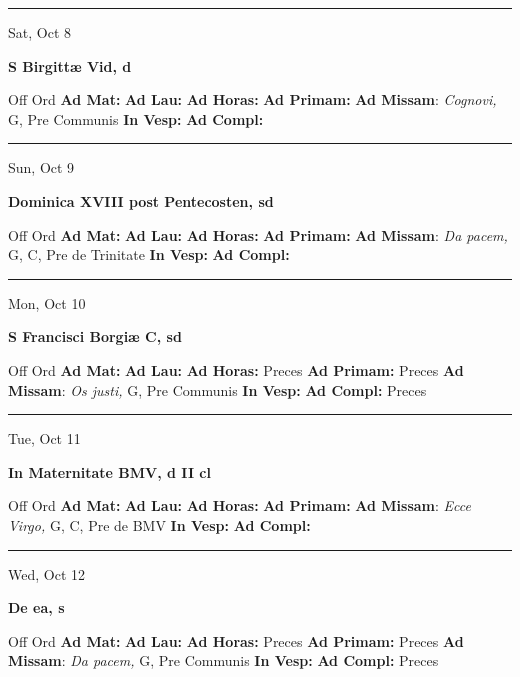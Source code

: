 \documentclass[letterpaper, 10pt]{article}
\begin{document}
\hrule
\begin{center}
Sat, Oct 8
\end{center}\textbf{ \large S Birgittæ Vid, \textnormal{\normalsize d}}
\begin{justify}
Off Ord
\textbf{Ad Mat: }
\textbf{Ad Lau: }
\textbf{Ad Horas: }
\textbf{Ad Primam: }
\textbf{Ad Missam}: \textit{Cognovi,} G, Pre Communis
\textbf{In Vesp: }
\textbf{Ad Compl: }\end{justify}



\hrule
\begin{center}
Sun, Oct 9
\end{center}\textbf{ \large Dominica XVIII post Pentecosten, \textnormal{\normalsize sd}}
\begin{justify}
Off Ord
\textbf{Ad Mat: }
\textbf{Ad Lau: }
\textbf{Ad Horas: }
\textbf{Ad Primam: }
\textbf{Ad Missam}: \textit{Da pacem,} G, C, Pre de Trinitate
\textbf{In Vesp: }
\textbf{Ad Compl: }\end{justify}



\hrule
\begin{center}
Mon, Oct 10
\end{center}\textbf{ \large S Francisci Borgiæ C, \textnormal{\normalsize sd}}
\begin{justify}
Off Ord
\textbf{Ad Mat: }
\textbf{Ad Lau: }
\textbf{Ad Horas: }Preces
\textbf{Ad Primam: }Preces
\textbf{Ad Missam}: \textit{Os justi,} G, Pre Communis
\textbf{In Vesp: }
\textbf{Ad Compl: }Preces\end{justify}



\hrule
\begin{center}
Tue, Oct 11
\end{center}\textbf{ \large In Maternitate BMV, \textnormal{\normalsize d II cl}}
\begin{justify}
Off Ord
\textbf{Ad Mat: }
\textbf{Ad Lau: }
\textbf{Ad Horas: }
\textbf{Ad Primam: }
\textbf{Ad Missam}: \textit{Ecce Virgo,} G, C, Pre de BMV
\textbf{In Vesp: }
\textbf{Ad Compl: }\end{justify}



\hrule
\begin{center}
Wed, Oct 12
\end{center}\textbf{ \large De ea, \textnormal{\normalsize s}}
\begin{justify}
Off Ord
\textbf{Ad Mat: }
\textbf{Ad Lau: }
\textbf{Ad Horas: }Preces
\textbf{Ad Primam: }Preces
\textbf{Ad Missam}: \textit{Da pacem,} G, Pre Communis
\textbf{In Vesp: }
\textbf{Ad Compl: }Preces\end{justify}
\end{document}
